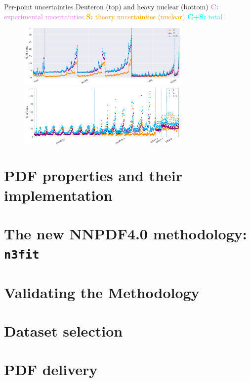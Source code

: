\documentclass{beamer}
\begin{document}
\begin{frame}{Per-point uncertainties}
\footnotesize{Deuteron (top) and heavy nuclear (bottom) }
\newline
\footnotesize{\textcolor{violet}{{\bf C:} experimental uncertainties}}
\newline
\footnotesize{\textcolor{orange}{{\bf S:} theory uncertainties (nuclear)}}
\newline
\footnotesize{\textcolor{cyan}{{\bf C+S:} total}}
  \begin{figure}
    \includegraphics[width=85mm]{nuclear_uncs/diagdeut.png}
    \includegraphics[width=85mm]{nuclear_uncs/diagnuc.png}
  \end{figure}
\end{frame}
\section{PDF properties and their implementation}

\section{The new NNPDF4.0 methodology: \texttt{n3fit}}


\section{Validating the Methodology}



\section{Dataset selection}

\section{PDF delivery}
\end{document}
